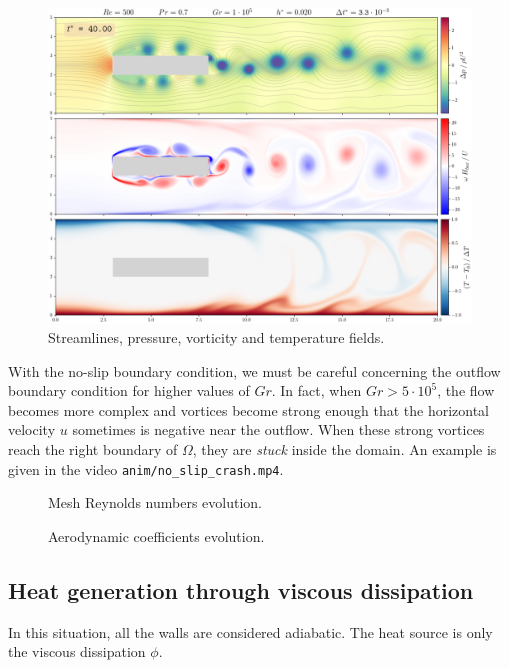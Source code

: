\documentclass[11 pt]{article}
\begin{document}
\begin{figure}[H]
    \centering
    \includegraphics[width=\textwidth]{../figures/frame_00400_no_slip.png}
    \caption{Streamlines, pressure, vorticity and temperature fields.}
    \label{fig:simu_no_slip}
\end{figure}

With the no-slip boundary condition, we must be careful concerning the outflow boundary condition for higher values of $Gr$. In fact, when $Gr > 5 \cdot 10^{5}$, the flow becomes more complex and vortices become strong enough that the horizontal velocity $u$ sometimes is negative near the outflow. When these strong vortices reach the right boundary of $\Omega$, they are \textit{stuck} inside the domain. An example is given in the video \texttt{anim/no\_slip\_crash.mp4}.

\begin{figure}[H]
    \centering
    
    \caption{Mesh Reynolds numbers evolution.}
    \label{fig:mesh_re_no_slip}
\end{figure}

\begin{figure}[H]
    \centering
    
    \caption{Aerodynamic coefficients evolution.}
    \label{fig:drag_no_slip}
\end{figure}

\subsection{Heat generation through viscous dissipation}
In this situation, all the walls are considered adiabatic. The heat source is only the viscous dissipation $\phi$.
\end{document}
